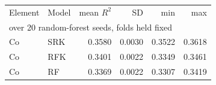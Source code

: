 \begin{tabular}{llrrrr}
\hline
Element & Model & mean $R^2$ & SD & min & max \\ \multicolumn{6}{l}{\footnotesize over 20 random-forest seeds, folds held fixed} \\
\hline
Co & SRK & 0.3580 & 0.0030 & 0.3522 & 0.3618 \\
Co & RFK & 0.3401 & 0.0022 & 0.3349 & 0.3461 \\
Co & RF & 0.3369 & 0.0022 & 0.3307 & 0.3419 \\
\hline
\end{tabular}
